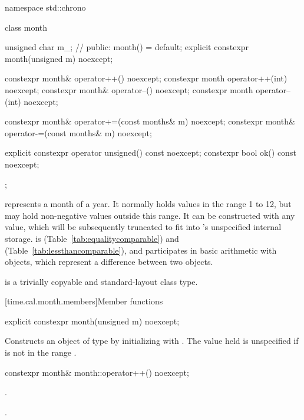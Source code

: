 \begin{codeblock}
namespace std::chrono {
  class month {
    unsigned char m_;           // \expos
  public:
    month() = default;
    explicit constexpr month(unsigned m) noexcept;

    constexpr month& operator++()    noexcept;
    constexpr month  operator++(int) noexcept;
    constexpr month& operator--()    noexcept;
    constexpr month  operator--(int) noexcept;

    constexpr month& operator+=(const months& m) noexcept;
    constexpr month& operator-=(const months& m) noexcept;

    explicit constexpr operator unsigned() const noexcept;
    constexpr bool ok() const noexcept;
  };
}
\end{codeblock}

\pnum
{} represents a month of a year.
It normally holds values in the range 1 to 12,
but may hold non-negative values outside this range.
It can be constructed with any  value,
which will be subsequently truncated to fit into 's unspecified internal storage.
 is  (Table~\ref{tab:equalitycomparable})
and  (Table~\ref{tab:lessthancomparable}),
and participates in basic arithmetic with  objects,
which represent a difference between two  objects.

\pnum
{} is a trivially copyable and standard-layout class type.

[time.cal.month.members]{Member functions}

%
\begin{itemdecl}
explicit constexpr month(unsigned m) noexcept;
\end{itemdecl}

\begin{itemdescr}
\pnum
\effects
Constructs an object of type  by
initializing  with .
The value held is unspecified if  is not in the range .
\end{itemdescr}

%
\begin{itemdecl}
constexpr month& month::operator++() noexcept;
\end{itemdecl}

\begin{itemdescr}
\pnum
\effects {}.

\pnum
\returns {}.
\end{itemdescr}

